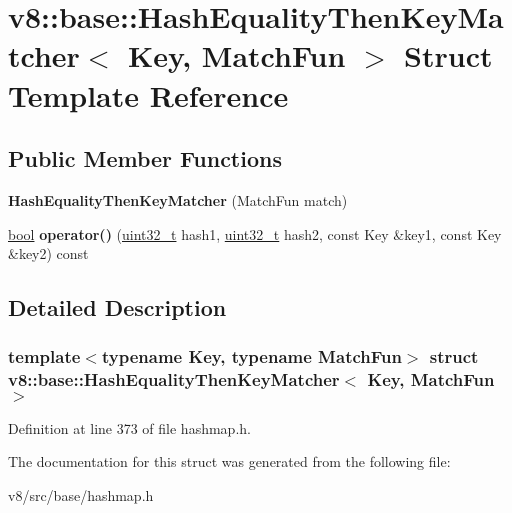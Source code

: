 \hypertarget{structv8_1_1base_1_1HashEqualityThenKeyMatcher}{}\section{v8\+:\+:base\+:\+:Hash\+Equality\+Then\+Key\+Matcher$<$ Key, Match\+Fun $>$ Struct Template Reference}
\label{structv8_1_1base_1_1HashEqualityThenKeyMatcher}
\subsection*{Public Member Functions}
\begin{DoxyCompactItemize}
\item 
\mbox{\label{structv8_1_1base_1_1HashEqualityThenKeyMatcher_a2c32104aa06b4f1381e85fae9b58faa5}} 
{\bfseries Hash\+Equality\+Then\+Key\+Matcher} (Match\+Fun match)
\item 
\mbox{\label{structv8_1_1base_1_1HashEqualityThenKeyMatcher_a08a625d3f9d544ebc22689c99e1e851a}} 
\mbox{\hyperlink{classbool}{bool}} {\bfseries operator()} (\mbox{\hyperlink{classuint32__t}{uint32\+\_\+t}} hash1, \mbox{\hyperlink{classuint32__t}{uint32\+\_\+t}} hash2, const Key \&key1, const Key \&key2) const
\end{DoxyCompactItemize}


\subsection{Detailed Description}
\subsubsection*{template$<$typename Key, typename Match\+Fun$>$\newline
struct v8\+::base\+::\+Hash\+Equality\+Then\+Key\+Matcher$<$ Key, Match\+Fun $>$}



Definition at line 373 of file hashmap.\+h.



The documentation for this struct was generated from the following file\+:\begin{DoxyCompactItemize}
\item 
v8/src/base/hashmap.\+h\end{DoxyCompactItemize}

